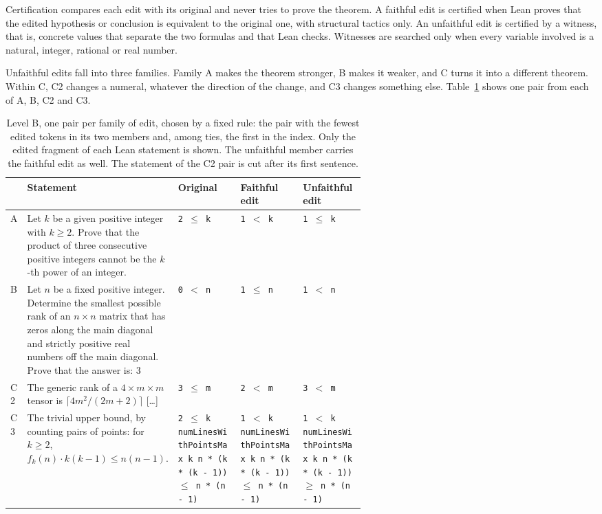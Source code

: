 \documentclass[10pt]{article}
\begin{document}
Certification compares each edit with its original and never tries to prove the theorem. A faithful edit is certified
when Lean proves that the edited hypothesis or conclusion is equivalent to the original one, with structural tactics
only. An unfaithful edit is certified by a witness, that is, concrete values that separate the two formulas and that
Lean checks. Witnesses are searched only when every variable involved is a natural, integer, rational or real number.

Unfaithful edits fall into three families. Family A makes the theorem stronger, B makes it weaker, and C turns it
into a different theorem. Within C, C2 changes a numeral, whatever the direction of the change, and C3 changes something else.
Table~\ref{tab:bejemplos} shows one pair from each of A, B, C2 and C3.

\begin{table}[h]
\centering
\caption{Level B, one pair per family of edit, chosen by a fixed rule: the pair with the fewest edited tokens in its two members and, among ties, the first in the index. Only the edited fragment of each Lean statement is shown. The unfaithful member carries the faithful edit as well. The statement of the C2 pair is cut after its first sentence.}
\label{tab:bejemplos}
\vspace{2pt}
{\footnotesize
\begin{tabularx}{\linewidth}{@{}lX>{\raggedright\arraybackslash}p{0.2\linewidth}>{\raggedright\arraybackslash}p{0.2\linewidth}>{\raggedright\arraybackslash}p{0.2\linewidth}@{}}
\toprule
 & Statement & Original & Faithful edit & Unfaithful edit\\
\midrule
A & Let \(k\) be a given positive integer with \(k\geqslant2\). Prove that the product of three consecutive positive integers cannot be the \(k\) -th power of an integer. & \texttt{2 $\le$ k} & \texttt{1 $<$ k} & \texttt{1 $\le$ k}\\
\addlinespace
B & Let $n$ be a fixed positive integer. Determine the smallest possible rank of an $n \times n$ matrix that has zeros along the main diagonal and strictly positive real numbers off the main diagonal. Prove that the answer is: 3 & \texttt{0 $<$ n} & \texttt{1 $\le$ n} & \texttt{1 $<$ n}\\
\addlinespace
C2 & The generic rank of a $4 \times m \times m$ tensor is $\lceil 4m^2 / (2m + 2) \rceil$ [\ldots] & \texttt{3 $\le$ m} & \texttt{2 $<$ m} & \texttt{3 $<$ m}\\
\addlinespace
C3 & The trivial upper bound, by counting pairs of points: for $k \geq 2$, $f_k(n) \cdot k(k-1) \leq n(n-1).$ & \texttt{2 $\le$ k} \newline \texttt{numLinesWithPointsMax k n * (k * (k - 1)) $\le$ n * (n - 1)} & \texttt{1 $<$ k} \newline \texttt{numLinesWithPointsMax k n * (k * (k - 1)) $\le$ n * (n - 1)} & \texttt{1 $<$ k} \newline \texttt{numLinesWithPointsMax k n * (k * (k - 1)) $\ge$ n * (n - 1)}\\
\bottomrule
\end{tabularx}}
\end{table}
\end{document}

